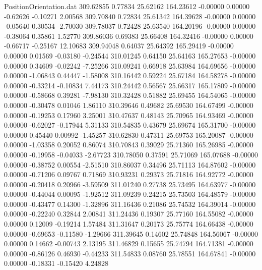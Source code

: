 \begin{filecontents}{PositionOrientation.dat}
 309.62855    0.77834   25.62162   164.23612   -0.00000    0.00000   -0.62626   -0.10271    2.00568
 309.70840    0.72834   25.61342   164.39628   -0.00000    0.00000   -0.05640    0.30534   -2.70030
 309.78037    0.72428   25.63540   164.20196   -0.00000    0.00000   -0.38064    0.35861    1.52770
 309.86036    0.69383   25.66408   164.32416   -0.00000    0.00000   -0.66717   -0.25167   12.10683
 309.94048    0.64037   25.64392   165.29419   -0.00000    0.00000    0.01569   -0.03180   -0.24544
 310.01245    0.64150   25.64163   165.27653   -0.00000    0.00000    0.34609   -0.02242   -7.25266
 310.09241    0.66918   25.63984   164.69656   -0.00000    0.00000   -1.06843    0.44447   -1.58008
 310.16442    0.59224   25.67184   164.58278   -0.00000    0.00000   -0.33214   -0.10834    7.44173
 310.24442    0.56567   25.66317   165.17809   -0.00000    0.00000   -0.58668    0.39281   -7.98130
 310.32428    0.51882   25.69455   164.54065   -0.00000    0.00000   -0.30478    0.01046    1.86110
 310.39646    0.49682   25.69530   164.67499   -0.00000    0.00000   -0.19253    0.17960    3.25001
 310.47637    0.48143   25.70965   164.93469   -0.00000    0.00000   -0.62027   -0.17944    5.31133
 310.54835    0.43679   25.69674   165.31700   -0.00000    0.00000    0.45440    0.00992   -1.45257
 310.62830    0.47311   25.69753   165.20087   -0.00000    0.00000   -1.03358    0.20052    0.86074
 310.70843    0.39029   25.71360   165.26985   -0.00000    0.00000   -0.19958   -0.04033   -2.67723
 310.78050    0.37591   25.71069   165.07688   -0.00000    0.00000   -0.38752    0.00554   -2.51510
 310.86037    0.34496   25.71113   164.87602   -0.00000    0.00000   -0.71206    0.09767    0.71869
 310.93231    0.29373   25.71816   164.92772   -0.00000    0.00000   -0.20418    0.20966   -3.59509
 311.01240    0.27738   25.73495   164.63977   -0.00000    0.00000   -0.44044    0.00095   -1.92512
 311.09239    0.24215   25.73503   164.48579   -0.00000    0.00000   -0.43477    0.14300   -1.32896
 311.16436    0.21086   25.74532   164.39014   -0.00000    0.00000   -0.22240    0.32844    2.00841
 311.24436    0.19307   25.77160   164.55082   -0.00000    0.00000    0.12009   -0.19214    1.57484
 311.31647    0.20173   25.75774   164.66438   -0.00000    0.00000   -0.69653   -0.11580   -1.29666
 311.39645    0.14602   25.74848   164.56067   -0.00000    0.00000    0.14662   -0.00743    2.13195
 311.46829    0.15655   25.74794   164.71381   -0.00000    0.00000   -0.86126    0.46930   -0.44233
 311.54833    0.08760   25.78551   164.67841   -0.00000    0.00000   -0.18331   -0.15420    4.24828

\end{filecontents}
